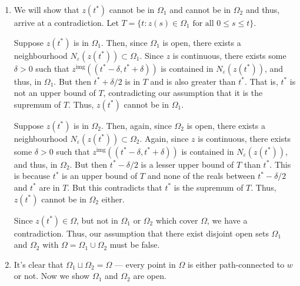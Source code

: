 \documentclass[12 pt, letterpaper]{hmcpset}
\begin{document}
\begin{solution}
	\begin{enumerate}
		\item We will show that $z(t^{*})$ cannot be in $\Omega_{1}$ and cannot be in $\Omega_{2}$ and thus, arrive at a contradiction. Let $T = \{ t : z(s) \in \Omega_{1} \text{ for all } 0 \le s \le t \}$.

			Suppose $z(t^{*})$ is in $\Omega_{1}$. Then, since $\Omega_{1}$ is open, there exists a neighbourhood  $N_{\varepsilon}(z(t^{*})) \subset \Omega_{1}$. Since $z$ is continuous, there exists some $\delta > 0$ such that $z^{\text{img}}((t^{*} - \delta, t^{*} + \delta))$ is contained in $N_{\varepsilon}(z(t^{*}))$, and thus, in $\Omega_{1}$. But then $t^{*} + \delta/2$ is in $T$ and is also greater than $t^{*}$. That is, $t^{*}$ is not an upper bound of $T$, contradicting our assumption that it is the supremum of $T$. Thus, $z(t^{*})$ cannot be in $\Omega_{1}$.

			Suppose $z(t^{*})$ is in $\Omega_{2}$. Then, again, since $\Omega_{2}$ is open, there exists a neighbourhood $N_{\varepsilon}(z(t^{*})) \subset \Omega_{2}$. Again, since $z$ is continuous, there exists some $\delta > 0$ such that $z^{\text{img}}((t^{*} - \delta, t^{*} + \delta))$ is contained in $N_{\varepsilon}(z(t^{*}))$, and thus, in $\Omega_{2}$. But then $t^{*} - \delta/2$ is a lesser upper bound of $T$ than $t^{*}$. This is because $t^{*}$ is an upper bound of $T$ and none of the reals between $t^{*} - \delta/2$ and $t^{*}$ are in $T$. But this contradicts that $t^{*}$ is the supremum of $T$. Thus, $z(t^{*})$ cannot be in $\Omega_{2}$ either.

			Since $z(t^{*}) \in \Omega$, but not in $\Omega_{1}$ or $\Omega_{2}$ which cover $\Omega$, we have a contradiction. Thus, our assumption that there exist disjoint open sets $\Omega_{1}$ and $\Omega_{2}$ with $\Omega = \Omega_{1} \cup \Omega_{2}$ must be false.
		\item 
			It's clear that $\Omega_{1} \sqcup \Omega_{2} = \Omega$ --- every point in $\Omega$ is either path-connected to $w$ or not. Now we show $\Omega_{1}$ and $\Omega_{2}$ are open.


\end{enumerate}
\end{solution}
\end{document}
